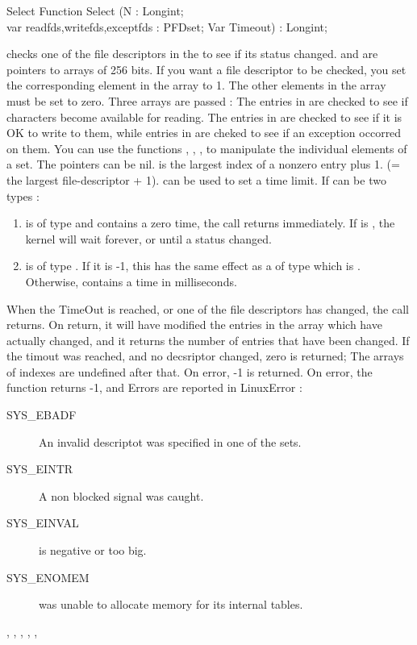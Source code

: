 \begin{function}{Select}
\Declaration
Function Select (N : Longint; \\ var readfds,writefds,exceptfds : PFDset;
Var Timeout) : Longint;

\Description
{} checks one of the file descriptors in the  to see if its
status changed.
 and  are pointers to arrays of 256
bits. If you want a file descriptor to be checked, you set the
corresponding element in the array to 1. The other elements in the array
must be set to zero. Three arrays are passed : The entries in 
are checked to see if characters become available for reading. The entries
in  are checked to see if it is OK to write to them, while
entries in  are cheked to see if an exception occorred on
them.
You can use the functions , , 
,  to manipulate the individual elements of a set.
The pointers can be nil.
 is the largest index of a nonzero entry plus 1. (= the largest
file-descriptor + 1).
 can be used to set a time limit. 
If  can be two types :
\begin{enumerate}
\item {} is of type  and contains a
zero time, the call returns immediately. If  is , the
kernel will wait forever, or until a status changed.    
\item {} is of type . If it is -1, this has the same
effect as a  of type   which is .
Otherwise,  contains a time in milliseconds.
\end{enumerate}
 
When the TimeOut is reached, or one of the file descriptors has changed,
the  call returns. On return, it will have modified the entries
in the array which have actually changed, and it returns the number of
entries that have been changed. If the timout was reached, and no decsriptor
changed, zero is returned; The arrays of indexes are undefined after that.
On error, -1 is returned.
\Errors
On error, the function returns -1, and Errors are reported in LinuxError :
\begin{description}
\item[SYS\_EBADF\ ] An invalid descriptot was specified in one of the sets.
\item[SYS\_EINTR\ ] A non blocked signal was caught.
\item[SYS\_EINVAL\ ]   is negative or too big.
\item[SYS\_ENOMEM\ ]  was unable to allocate memory for its 
 internal tables.
\end{description}
\SeeAlso
{}, , 
,
,
, 
\end{function}

